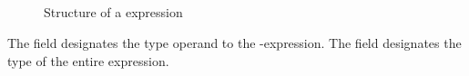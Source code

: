 

\subsection{}
\label{sec:ifc:ExprSort:Typeid}

\begin{figure}[H]
	\centering
	\caption{Structure of a  expression}
	\label{fig:ifc-typeid-structure}
\end{figure}

The field  designates the type operand to the -expression.
The field  designates the type of the entire expression.



\subsection{}
\label{sec:ifc:ExprSort:DestructorCall}

